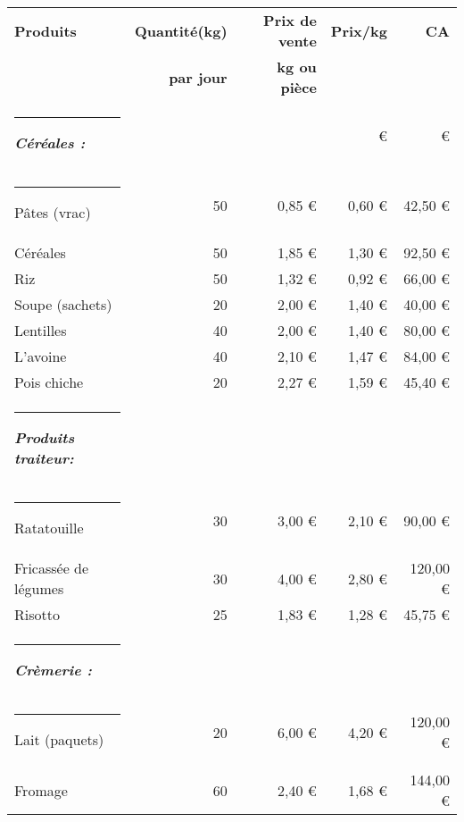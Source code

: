 \documentclass[12pt,a4paper]{report}
\begin{document}
				\begin{table}[h]
						\centering
						\begin{tabular}{lrrrr}
							\textbf{ Produits } & \textbf{Quantité(kg)} & \textbf{ Prix de vente} & \textbf{ Prix/kg } & \textbf{ CA} \\
							& \textbf{par jour} & \textbf{kg ou pièce} & & \\
							\rule[0.5cm]{-0.1cm}{0cm}
					\textbf{\textit{\color{green}Céréales :}} &       &       &  €  &  €  \\
					\rule[0.5cm]{-0.1cm}{0cm}
					Pâtes (vrac)  & 50    &                                    0,85 €  &                         0,60 €  &                                 42,50 €  \\
					Céréales  & 50    &                                    1,85 €  &                         1,30 €  &                                 92,50 €  \\
					Riz & 50    &                                    1,32 €  &                         0,92 €  &                                 66,00 €  \\
					Soupe (sachets)  & 20    &                                    2,00 €  &                         1,40 €  &                                 40,00 €  \\
					Lentilles & 40    &                                    2,00 €  &                         1,40 €  &                                 80,00 €  \\
					L'avoine   & 40    &                                    2,10 €  &                         1,47 €  &                                 84,00 €  \\
					 Pois chiche  & 20    &                                    2,27 €  &                         1,59 €  &                                 45,40 €  \\
					\rule[0.5cm]{-0.1cm}{0cm}
					\textit{\textbf{\color{green}Produits traiteur:}}  &       &       &     &     \\
					\rule[0.5cm]{-0.1cm}{0cm}
					Ratatouille  & 30    &                                    3,00 €  &                         2,10 €  &                                 90,00 €  \\
					Fricassée de légumes  & 30    &                                    4,00 €  &                         2,80 €  &                               120,00 €  \\
					Risotto  & 25    &                                    1,83 €  &                         1,28 €  &                                 45,75 €  \\
					\rule[0.5cm]{-0.1cm}{0cm}
					\textbf{\textit{\color{green}Crèmerie : }} &       &       &    &  \\
					\rule[0.5cm]{-0.1cm}{0cm}
					Lait (paquets)  & 20    &                                    6,00 €  &                         4,20 €  &                               120,00 €  \\
					Fromage  & 60    &                                    2,40 €  &                         1,68 €  &                               144,00 €  \\
					

\end{tabular}
\end{table}
\end{document}
